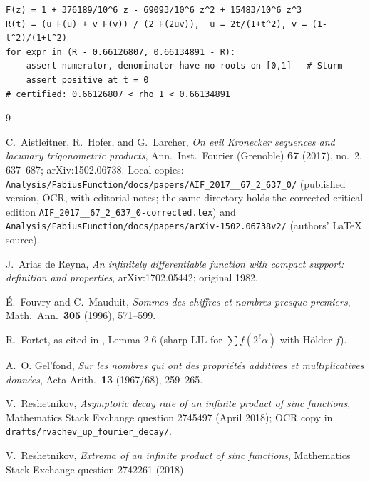 \documentclass[11pt,oneside]{article}
\theoremstyle{definition}
\theoremstyle{remark}
\begin{document}
\begin{lstlisting}[style=pseudo,caption={Document 4's certificate,
as executed (passes)}]
F(z) = 1 + 376189/10^6 z - 69093/10^6 z^2 + 15483/10^6 z^3
R(t) = (u F(u) + v F(v)) / (2 F(2uv)),  u = 2t/(1+t^2), v = (1-t^2)/(1+t^2)
for expr in (R - 0.66126807, 0.66134891 - R):
    assert numerator, denominator have no roots on [0,1]   # Sturm
    assert positive at t = 0
# certified: 0.66126807 < rho_1 < 0.66134891
\end{lstlisting}

\begin{thebibliography}{9}

C.~Aistleitner, R.~Hofer, and G.~Larcher,
\emph{On evil Kronecker sequences and lacunary trigonometric products},
Ann.\ Inst.\ Fourier (Grenoble) \textbf{67} (2017), no.~2, 637--687;
arXiv:1502.06738.
Local copies:
\nolinkurl{Analysis/FabiusFunction/docs/papers/AIF_2017__67_2_637_0/}
(published version, OCR, with editorial notes; the same directory holds
the corrected critical edition
\nolinkurl{AIF_2017__67_2_637_0-corrected.tex}) and
\nolinkurl{Analysis/FabiusFunction/docs/papers/arXiv-1502.06738v2/}
(authors' \LaTeX{} source).

J.~Arias de Reyna,
\emph{An infinitely differentiable function with compact support:
definition and properties}, arXiv:1702.05442; original 1982.

\'E.~Fouvry and C.~Mauduit,
\emph{Sommes des chiffres et nombres presque premiers},
Math.\ Ann.\ \textbf{305} (1996), 571--599.

R.~Fortet, as cited in \cite{ahl2017}, Lemma 2.6 (sharp LIL for
$\sum f(2^\ell\alpha)$ with H\"older $f$).

A.~O. Gel'fond,
\emph{Sur les nombres qui ont des propri\'et\'es additives et
multiplicatives donn\'ees},
Acta Arith.\ \textbf{13} (1967/68), 259--265.

V.~Reshetnikov,
\emph{Asymptotic decay rate of an infinite product of sinc functions},
Mathematics Stack Exchange question 2745497 (April 2018); OCR copy in
\nolinkurl{drafts/rvachev_up_fourier_decay/}.

V.~Reshetnikov,
\emph{Extrema of an infinite product of sinc functions},
Mathematics Stack Exchange question 2742261 (2018).

\end{thebibliography}
\end{document}
